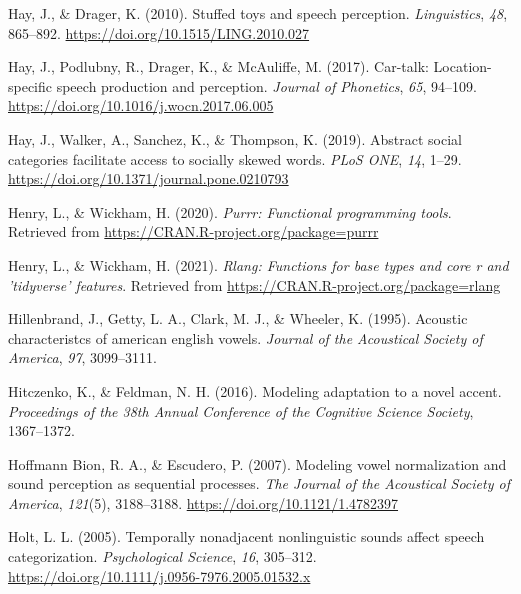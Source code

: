 \documentclass[
  11pt,
  english,
  man,floatsintext]{apa6}
\newlength{\cslhangindent}
\newlength{\cslentryspacingunit} %
\newenvironment{CSLReferences}[2] %
 {%
  \setlength{\parindent}{0pt}
  \ifodd #1
  \let\oldpar\par
  \def\par{\hangindent=\cslhangindent\oldpar}
  \fi
  \setlength{\parskip}{#2\cslentryspacingunit}
 }%
 {}
\begin{document}
\begin{CSLReferences}{1}{0}
\leavevmode{}%
Hay, J., \& Drager, K. (2010). Stuffed toys and speech perception. \emph{Linguistics}, \emph{48}, 865--892. \url{https://doi.org/10.1515/LING.2010.027}

\leavevmode{}%
Hay, J., Podlubny, R., Drager, K., \& McAuliffe, M. (2017). Car-talk: Location-specific speech production and perception. \emph{Journal of Phonetics}, \emph{65}, 94--109. \url{https://doi.org/10.1016/j.wocn.2017.06.005}

\leavevmode{}%
Hay, J., Walker, A., Sanchez, K., \& Thompson, K. (2019). Abstract social categories facilitate access to socially skewed words. \emph{PLoS ONE}, \emph{14}, 1--29. \url{https://doi.org/10.1371/journal.pone.0210793}

\leavevmode{}%
Henry, L., \& Wickham, H. (2020). \emph{Purrr: Functional programming tools}. Retrieved from \url{https://CRAN.R-project.org/package=purrr}

\leavevmode{}%
Henry, L., \& Wickham, H. (2021). \emph{Rlang: Functions for base types and core r and 'tidyverse' features}. Retrieved from \url{https://CRAN.R-project.org/package=rlang}

\leavevmode{}%
Hillenbrand, J., Getty, L. A., Clark, M. J., \& Wheeler, K. (1995). Acoustic characteristcs of american english vowels. \emph{Journal of the Acoustical Society of America}, \emph{97}, 3099--3111.

\leavevmode{}%
Hitczenko, K., \& Feldman, N. H. (2016). Modeling adaptation to a novel accent. \emph{Proceedings of the 38th Annual Conference of the Cognitive Science Society}, 1367--1372.

\leavevmode{}%
Hoffmann Bion, R. A., \& Escudero, P. (2007). Modeling vowel normalization and sound perception as sequential processes. \emph{The Journal of the Acoustical Society of America}, \emph{121}(5), 3188--3188. \url{https://doi.org/10.1121/1.4782397}

\leavevmode{}%
Holt, L. L. (2005). Temporally nonadjacent nonlinguistic sounds affect speech categorization. \emph{Psychological Science}, \emph{16}, 305--312. \url{https://doi.org/10.1111/j.0956-7976.2005.01532.x}


\end{CSLReferences}
\end{document}
